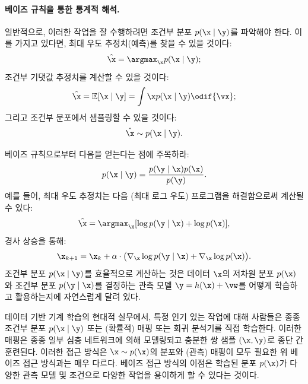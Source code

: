 \documentclass[../../book-main_ko.tex]{subfiles}
\begin{document}
\paragraph{베이즈 규칙을 통한 통계적 해석.}일반적으로, 이러한 작업을 잘 수행하려면 조건부 분포 $p(\x\mid \y)$를 파악해야 한다. 이를 가지고 있다면, 최대 우도 추정치(예측)를 찾을 수 있을 것이다:
\begin{equation}
  \hat{\x} = \argmax_{\x} p(\x\mid \y);
\end{equation}
조건부 기댓값 추정치를 계산할 수 있을 것이다:
\begin{equation}
  \hat{\x} = \mathbb{E}[\x \mid \y] = \int \x p(\x\mid \y)\odif{\vx};
\end{equation}
그리고 조건부 분포에서 샘플링할 수 있을 것이다:
\begin{equation}
  \hat{\x} \sim p(\x \mid \y).
\end{equation}

베이즈 규칙으로부터 다음을 얻는다는 점에 주목하라:
\begin{equation}
  p(\x\mid \y) = \frac{p(\y\mid \x) p(\x) }{p(\y)}.
\end{equation}
예를 들어, 최대 우도 추정치는 다음 (최대 로그 우도) 프로그램을 해결함으로써 계산될 수 있다:
\begin{equation}
    \hat{\x} = \argmax_{\x} [\log p(\y\mid \x) + \log p(\x)],
\end{equation}
경사 상승을 통해:
\begin{equation}
    \x_{k+1} = \x_k + \alpha \cdot \big(\nabla_{\x} \log p(\y \mid \x) + \nabla_{\x} \log p(\x)\big).
    \label{eqn:loglikelihoo-gradient-ascent}
\end{equation}
조건부 분포 $p(\x \mid \y)$를 효율적으로 계산하는 것은 데이터 $\x$의 저차원 분포 $p(\x)$와 조건부 분포 $p(\y \mid \x)$를 결정하는 관측 모델 $\y = h(\x) + \vw$를 어떻게 학습하고 활용하는지에 자연스럽게 달려 있다.

\begin{remark}[종단 간 대 베이즈]
데이터 기반 기계 학습의 현대적 실무에서, 특정 인기 있는 작업에 대해 사람들은 종종 조건부 분포 $p(\x\mid \y)$ 또는 (확률적) 매핑 또는 회귀 분석기를 직접 학습한다. 이러한 매핑은 종종 일부 심층 네트워크에 의해 모델링되고 충분한 쌍 샘플 $(\x, \y)$로 종단 간 훈련된다. 이러한 접근 방식은 $\x \sim p(\x)$의 분포와 (관측) 매핑이 모두 필요한 위 베이즈 접근 방식과는 매우 다르다. 베이즈 접근 방식의 이점은 학습된 분포 $p(\x)$가 다양한 관측 모델 및 조건으로 다양한 작업을 용이하게 할 수 있다는 것이다.
\end{remark}
\end{document}
